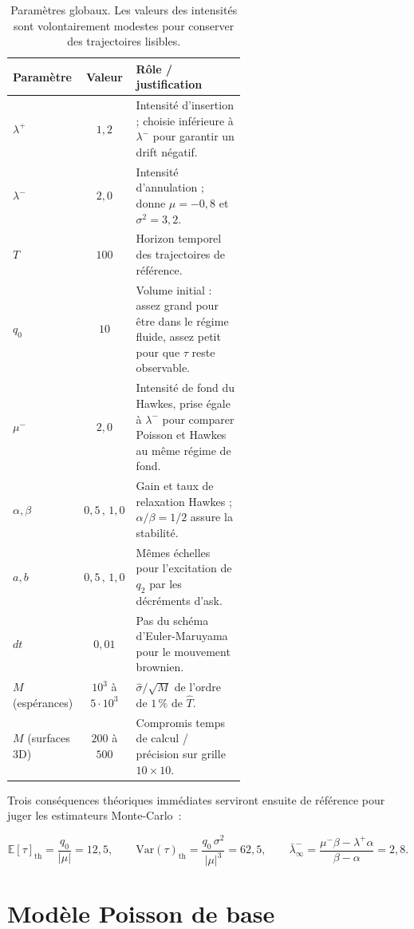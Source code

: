 \documentclass[11pt,a4paper]{article}
\newcommand{\E}{\mathbb{E}}
\begin{document}
\begin{table}[H]
\centering
\small
\begin{tabular}{@{}lcp{0.58\linewidth}@{}}
\toprule
Paramètre & Valeur & Rôle / justification \\
\midrule
$\lambda^+$ & $1{,}2$ & Intensité d'insertion ; choisie inférieure à $\lambda^-$ pour garantir un drift négatif. \\
$\lambda^-$ & $2{,}0$ & Intensité d'annulation ; donne $\mu = -0{,}8$ et $\sigma^2 = 3{,}2$. \\
$T$ & $100$ & Horizon temporel des trajectoires de référence. \\
$q_0$ & $10$ & Volume initial : assez grand pour être dans le régime fluide, assez petit pour que $\tau$ reste observable. \\
$\mu^-$ & $2{,}0$ & Intensité de fond du Hawkes, prise égale à $\lambda^-$ pour comparer Poisson et Hawkes au même régime de fond. \\
$\alpha, \beta$ & $0{,}5\,,\,1{,}0$ & Gain et taux de relaxation Hawkes ; $\alpha/\beta = 1/2$ assure la stabilité. \\
$a, b$ & $0{,}5\,,\,1{,}0$ & Mêmes échelles pour l'excitation de $q_2$ par les décréments d'ask. \\
$dt$ & $0{,}01$ & Pas du schéma d'Euler-Maruyama pour le mouvement brownien. \\
$M$ (espérances) & $10^3$ à $5\cdot10^3$ & $\hat\sigma/\sqrt{M}$ de l'ordre de $1\,\%$ de $\hat T$. \\
$M$ (surfaces 3D) & $200$ à $500$ & Compromis temps de calcul / précision sur grille $10 \times 10$. \\
\bottomrule
\end{tabular}
\caption{Paramètres globaux. Les valeurs des intensités sont volontairement
modestes pour conserver des trajectoires lisibles.}
\label{tab:params}
\end{table}

Trois conséquences théoriques immédiates serviront ensuite de référence pour
juger les estimateurs Monte-Carlo~:

\[
\E[\tau]_{\text{th}} = \frac{q_0}{|\mu|} = 12{,}5,
\qquad
\mathrm{Var}(\tau)_{\text{th}} = \frac{q_0\,\sigma^2}{|\mu|^3} = 62{,}5,
\qquad
\bar\lambda^-_{\infty} = \frac{\mu^-\beta - \lambda^+\alpha}{\beta - \alpha} = 2{,}8.
\]

\section{Modèle Poisson de base}
\end{document}
